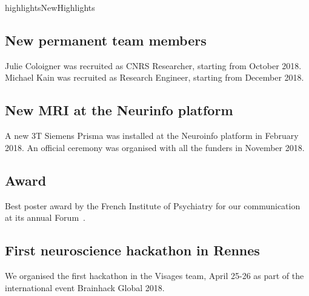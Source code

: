 \documentclass{ra2018}
\begin{document}

\begin{module}{highlights}{NewHighlights}{}

\subsection{New permanent team members}
Julie Coloigner was recruited as CNRS Researcher, starting from October 2018.
Michael Kain was recruited as Research Engineer, starting from December 2018.

\subsection{New MRI at the Neurinfo platform}
A new 3T Siemens Prisma was installed at the Neuroinfo platform in February 2018. An official ceremony was organised with all the funders in November 2018.

\subsection{Award}
Best poster award by the French Institute of Psychiatry for our communication at its annual Forum~.

\subsection{First neuroscience hackathon in Rennes}
We organised the first hackathon in the Visages team, April 25-26 as part of the international event Brainhack Global 2018.



\end{module}
\end{document}
